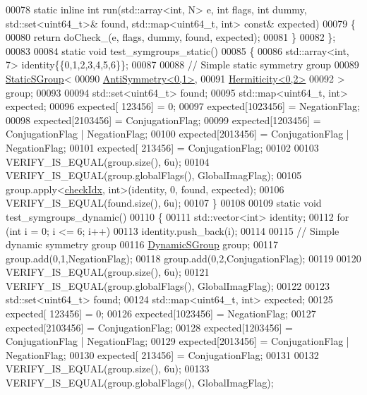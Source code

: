 \begin{DoxyCode}
00078   \textcolor{keyword}{static} \textcolor{keyword}{inline} \textcolor{keywordtype}{int} run(std::array<int, N> e, \textcolor{keywordtype}{int} flags, \textcolor{keywordtype}{int} dummy, std::set<uint64\_t>& found, 
      std::map<uint64\_t, int> \textcolor{keyword}{const}& expected)
00079   \{
00080     \textcolor{keywordflow}{return} doCheck\_(e, flags, dummy, found, expected);
00081   \}
00082 \};
00083 
00084 \textcolor{keyword}{static} \textcolor{keywordtype}{void} test\_symgroups\_static()
00085 \{
00086   std::array<int, 7> identity\{\{0,1,2,3,4,5,6\}\};
00087 
00088   \textcolor{comment}{// Simple static symmetry group}
00089   \hyperlink{class_eigen_1_1_static_s_group}{StaticSGroup}<
00090     \hyperlink{struct_eigen_1_1_anti_symmetry}{AntiSymmetry<0,1>},
00091     \hyperlink{struct_eigen_1_1_hermiticity}{Hermiticity<0,2>}
00092   > group;
00093 
00094   std::set<uint64\_t> found;
00095   std::map<uint64\_t, int> expected;
00096   expected[ 123456] = 0;
00097   expected[1023456] = NegationFlag;
00098   expected[2103456] = ConjugationFlag;
00099   expected[1203456] = ConjugationFlag | NegationFlag;
00100   expected[2013456] = ConjugationFlag | NegationFlag;
00101   expected[ 213456] = ConjugationFlag;
00102 
00103   VERIFY\_IS\_EQUAL(group.size(), 6u);
00104   VERIFY\_IS\_EQUAL(group.globalFlags(), GlobalImagFlag);
00105   group.apply<\hyperlink{structcheck_idx}{checkIdx}, \textcolor{keywordtype}{int}>(identity, 0, found, expected);
00106   VERIFY\_IS\_EQUAL(found.size(), 6u);
00107 \}
00108 
00109 \textcolor{keyword}{static} \textcolor{keywordtype}{void} test\_symgroups\_dynamic()
00110 \{
00111   std::vector<int> identity;
00112   \textcolor{keywordflow}{for} (\textcolor{keywordtype}{int} i = 0; i <= 6; i++)
00113     identity.push\_back(i);
00114 
00115   \textcolor{comment}{// Simple dynamic symmetry group}
00116   \hyperlink{class_eigen_1_1_dynamic_s_group}{DynamicSGroup} group;
00117   group.add(0,1,NegationFlag);
00118   group.add(0,2,ConjugationFlag);
00119 
00120   VERIFY\_IS\_EQUAL(group.size(), 6u);
00121   VERIFY\_IS\_EQUAL(group.globalFlags(), GlobalImagFlag);
00122 
00123   std::set<uint64\_t> found;
00124   std::map<uint64\_t, int> expected;
00125   expected[ 123456] = 0;
00126   expected[1023456] = NegationFlag;
00127   expected[2103456] = ConjugationFlag;
00128   expected[1203456] = ConjugationFlag | NegationFlag;
00129   expected[2013456] = ConjugationFlag | NegationFlag;
00130   expected[ 213456] = ConjugationFlag;
00131 
00132   VERIFY\_IS\_EQUAL(group.size(), 6u);
00133   VERIFY\_IS\_EQUAL(group.globalFlags(), GlobalImagFlag);

\end{DoxyCode}
